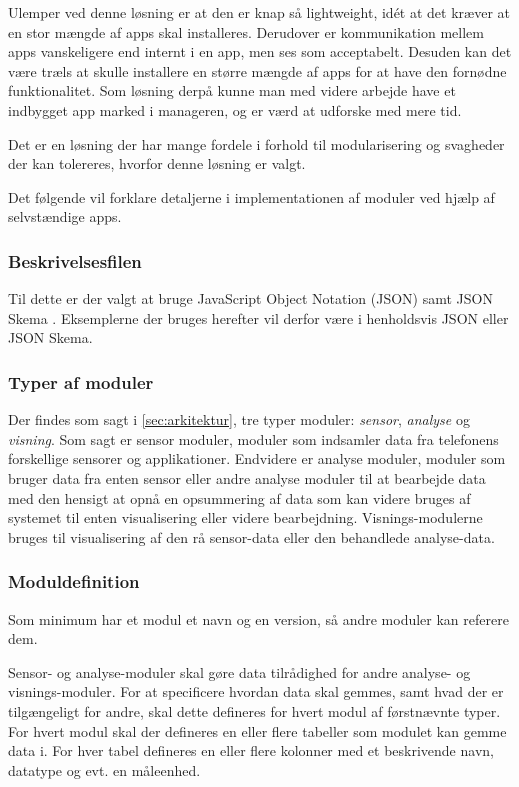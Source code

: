 Ulemper ved denne løsning er at den er knap så lightweight, idét at det kræver at en stor mængde af apps skal installeres.
Derudover er kommunikation mellem apps vanskeligere end internt i en app, men ses som acceptabelt.
Desuden kan det være træls at skulle installere en større mængde af apps for at have den fornødne funktionalitet.
Som løsning derpå kunne man med videre arbejde have et indbygget app marked i manageren, og er værd at udforske med mere tid.

Det er en løsning der har mange fordele i forhold til modularisering og svagheder der kan tolereres, hvorfor denne løsning er valgt. 

Det følgende vil forklare detaljerne i implementationen af moduler ved hjælp af selvstændige apps.

\subsubsection{Beskrivelsesfilen}

Til dette er der valgt at bruge JavaScript Object Notation (JSON) samt JSON Skema \cite{json_schema}.
Eksemplerne der bruges herefter vil derfor være i henholdsvis JSON eller JSON Skema.

\subsubsection{Typer af moduler}
Der findes som sagt i \cref{sec:arkitektur}, tre typer moduler: \textit{sensor}, \textit{analyse} og \textit{visning}.
Som sagt er sensor moduler, moduler som indsamler data fra telefonens forskellige sensorer og applikationer.
Endvidere er analyse moduler, moduler som bruger data fra enten sensor eller andre analyse moduler til at bearbejde data med den hensigt at opnå en opsummering af data som kan videre bruges af systemet til enten visualisering eller videre bearbejdning.
Visnings-modulerne bruges til visualisering af den rå sensor-data eller den behandlede analyse-data.

\subsubsection{Moduldefinition}
Som minimum har et modul et navn og en version, så andre moduler kan referere dem.

Sensor- og analyse-moduler skal gøre data tilrådighed for andre analyse- og visnings-moduler.
For at specificere hvordan data skal gemmes, samt hvad der er tilgængeligt for andre, skal dette defineres for hvert modul af førstnævnte typer.
For hvert modul skal der defineres en eller flere tabeller som modulet kan gemme data i.
For hver tabel defineres en eller flere kolonner med et beskrivende navn, datatype og evt. en måleenhed.

